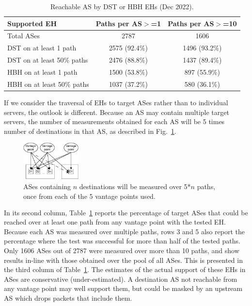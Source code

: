 \documentclass[conference]{IEEEtran}
\begin{document}
\begin{table}
\caption{Reachable AS by DST or HBH EHs (Dec 2022).}
\begin{tabular}{l|c|c}
Supported EH                & Paths per AS$>$=1 & Paths per AS$>$=10 \\
\hline \hline
Total  ASes                 & 2787              & 1606 \\
\hline
DST on at least 1 path      & 2575 (92.4\%)     & 1496 (93.2\%)      \\
DST on at least 50\% paths  & 2476 (88.8\%)     & 1437 (89.4\%)      \\ \hline
HBH on at least 1 path      & 1500 (53.8\%)      & 897 (55.9\%)      \\
HBH on at least 50\% paths  & 1037 (37.2\%)      & 580 (36.1\%)  
\end{tabular}
\label{tbl:as_pathspider}
\end{table}

If we consider the traversal of EHs to target ASes rather than to individual
servers, the outlook is different. Because an AS may contain multiple target servers, the number of measurements obtained for each AS will be 5 times number of destinations in that AS, as described in Fig.~\ref{fig:pspdr-AS}.
\begin{figure}[t]
\centering
  \includegraphics[width=0.27\textwidth]{pathspider-test-1.pdf}
  \caption{ASes containing $n$ destinations will be measured over 5*$n$ paths, once from each of the 5 vantage points used.}
  \label{fig:pspdr-AS}
\end{figure}
In its second column, Table~\ref{tbl:as_pathspider} reports the
percentage of target ASes that could be reached over at least one path from any vantage point with the tested EH. Because each AS was measured over multiple paths, rows 3 and 5 also report the percentage where the test was successful for more than half of the tested paths.
Only 1606 ASes out of 2787 were measured over more than 10 paths, and show results in-line with those obtained over the pool of all ASes. This is presented in the third column of Table~\ref{tbl:as_pathspider}.
The estimates of the actual support of these EHs in ASes are conservative (under-estimated). A destination AS not reachable from any vantage point may well support them, but could be masked by an upstream AS which drops packets that include them.
\end{document}
